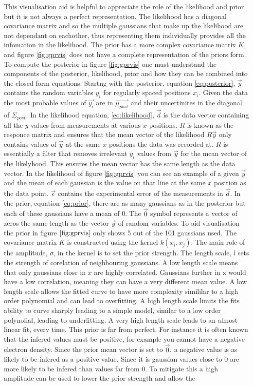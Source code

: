 This visualisation aid is helpful to appreciate the role of the likelihood and prior but it is not always a perfect representation. The likelihood has a diagonal covariance matrix and so the multiple gaussians that make up the likelihood are not dependant on eachother, thus representing them individually provides all the infomation in the likelihood. The prior has a more complex covariance matrix $K$, and figure \ref{fig:gprvis} does not have a complete representation of the priors form. To compute the posterior in figure \ref{fig:gprvis} one must understand the components of the posterior, likelihood, prior and how they can be combined into the closed form equations. Startng with the posterior, equation \ref{eq:posterior}, $\vec{y}$ contains the random variables $y_i$ for regularly spaced positions $x_i$. Given the data the most probable values of $\vec{y_i}$ are in $\vec{\mu_{post}}$ and their uncertinites in the diagonal of $\Sigma_{post}$. In the likelihood equation, \ref{eq:likelihood}, $\vec{d}$ is the data vector containing all the $y$-values from measurements at various $x$ positions. $R$ is known as the responce matrix and ensures that the mean vector of the likelihood $R\vec{y}$ only contains values of $\vec{y}$ at the same $x$ positions the data was recorded at. $R$ is essentially a filter that removes irrelevant $y_i$ values from $\vec{y}$ for the mean vector of the likelyhood. This ensures the mean vector has the same length as the data vector. In the likelihood of figure \ref{fig:gprvis} you can see an example of a given $\vec{y}$ and the mean of each gaussian is the value on that line at the same $x$ position as the data point. $\vec{\epsilon}$ contains the experimental error of the measurements in $\vec{d}$. In the prior, equation \ref{eq:prior}, there are as many gaussians as in the posterior but each of these gaussians have a mean of 0. The $\vec{0}$ symbol represents a vector of zeros the same length as the vector $\vec{y}$ of random variables. To aid visualisation the prior in figure $\ref{fig:gprvis}$ only shows 5 out of the 101 gaussians used. The covariance matrix $K$ is constructed using the kernel $k(x_i,x_j)$. The main role of the amplitude, $\sigma$, in the kernel is to set the prior strength. The length scale, $l$ sets the strength of corelation of neighbouring gaussians. A low length scale means that only gaussians close in $x$ are highly correlated. Gaussians further in x would have a low correlation, meaning they can have a very different mean value. A low length scale allows the fitted curve to have more complexity simililar to a high order polynomial and can lead to overfitting. A high length scale limits the fits ability to curve sharply leading to a simple model, similar to a low order polynolial, leading to underfitting. A very high length scale leads to an almost linear fit, every time. This prior is far from perfect. For instance it is often known that the infered values must be positive, for example you cannot have a negative electron density. Since the prior mean vector is set to $\vec{0}$, a negative value is as likely to be infered as a positive value. Since it is gaussian values close to 0 are more likely to be infered than values far from 0. To mitigate this a high amplitude can be used to lower the prior strength and allow the 